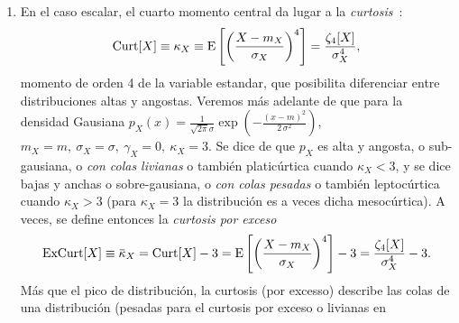 \begin{itemize}
\begin{enumerate}
\item  En  el caso  escalar,  el  cuarto momento  central  da  lugar  a la  {\it
    curtosis}~\cite{Pea05, Wes14}:
  \[
  \operatorname{Curt}[X]  \equiv \kappa_X  \equiv \operatorname{E}\left[  \left( \frac{X  - m_X}{\sigma_X}
    \right)^4 \right] = \frac{\zeta_4[X]}{\sigma_X^4},
  \]
  momento de orden  4 de la variable estandar,  que posibilita diferenciar entre
  distribuciones  altas y  angostas.   Veremos  m\'as adelante  de  que para  la
  densidad  Gausiana  $p_X(x)  =  \frac{1}{\sqrt{2  \pi}  \sigma}  \exp\left(  -
    \frac{(x-m)^2}{2 \, \sigma^2} \right)$, \ $m_X = m, \: \sigma_X = \sigma, \:
  \gamma_X =  0, \: \kappa_X  = 3$. Se  dice de que $p_X$  es alta y  angosta, o
  sub-gausiana,  o {\it con  colas livianas}  o tambi\'en  platic\'urtica cuando
  $\kappa_X < 3$,  y se dice bajas  y anchas o sobre-gausiana, o  {\it con colas
    pesadas} o tambi\'en leptoc\'urtica cuando  $\kappa_X > 3$ (para $\kappa_X =
  3$  la distribuci\'on es  a veces  dicha mesoc\'urtica).   A veces,  se define
  entonces la {\it curtosis por exceso}
  \[
  \Excurt[X]  \equiv \widebar{\kappa}_X  = \Curt[X]  - 3  =  \Esp\left[ \left(
      \frac{X     -     m_X}{\sigma_X}    \right)^4     \right]     -    3     =
  \frac{\zeta_4[X]}{\sigma_X^4} - 3.
  \]
  M\'as que  el pico de distribuci\'on,  la curtosis (por  excesso) describe las
  colas de una distribuci\'on (pesadas para el curtosis por exceso o livianas en

\end{enumerate}
\end{itemize}
